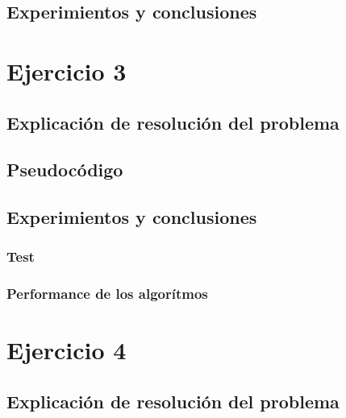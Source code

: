 \documentclass[12pt, a4paper]{article}
\begin{document}
\subsection{Experimientos y conclusiones}

%
%

\newpage
\section{Ejercicio 3} 
\subsection{Explicaci\'on de resoluci\'on del problema}

\subsection{Pseudoc\'odigo}

\subsection{Experimientos y conclusiones}
\subsubsection[2.5]{Test}

\subsubsection[2.5]{Performance de los algorítmos}


\newpage
\section{Ejercicio 4} 
\subsection{Explicaci\'on de resoluci\'on del problema}

\end{document}
